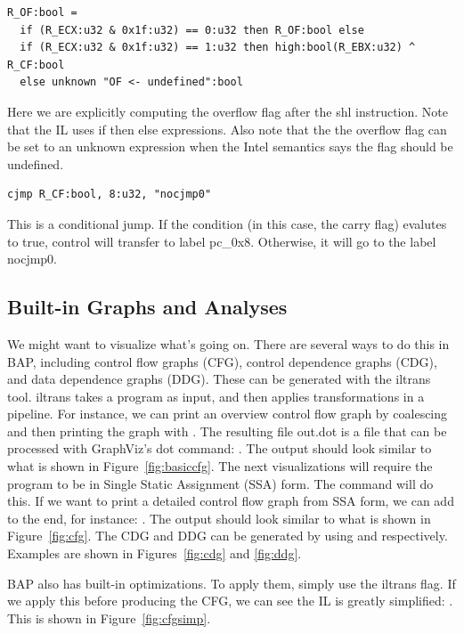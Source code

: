 \begin{verbatim}
R_OF:bool =
  if (R_ECX:u32 & 0x1f:u32) == 0:u32 then R_OF:bool else
  if (R_ECX:u32 & 0x1f:u32) == 1:u32 then high:bool(R_EBX:u32) ^ R_CF:bool
  else unknown "OF <- undefined":bool
\end{verbatim}
Here we are explicitly computing the overflow flag after the shl
instruction.  Note that the IL uses if then else expressions.  Also
note that the the overflow flag can be set to an unknown expression
when the Intel semantics says the flag should be undefined.

\begin{verbatim}
cjmp R_CF:bool, 8:u32, "nocjmp0"
\end{verbatim}
This is a conditional jump.  If the condition (in this case, the carry
flag) evalutes to true, control will transfer to label pc\_0x8.
Otherwise, it will go to the label nocjmp0.

\subsection{Built-in Graphs and Analyses}

We might want to visualize what's going on.  There are several ways to
do this in BAP, including control flow graphs (CFG), control
dependence graphs (CDG), and data dependence graphs (DDG).  These can
be generated with the iltrans tool.  iltrans takes a program as input,
and then applies transformations in a pipeline.  For instance, we can
print an overview control flow graph by coalescing and then printing
the graph with . The resulting file out.dot is a
file that can be processed with GraphViz's dot command: .  The output should look similar to what
is shown in Figure~\ref{fig:basiccfg}. The next visualizations will
require the program to be in Single Static Assignment (SSA) form.  The
command  will do this.  If we
want to print a detailed control flow graph from SSA form, we can add
 to the end, for instance: . The output should look
similar to what is shown in Figure~\ref{fig:cfg}. The CDG and DDG can
be generated by using  and 
respectively. Examples are shown in Figures~\ref{fig:cdg} and
\ref{fig:ddg}.

BAP also has built-in optimizations.  To apply them, simply use the
 iltrans flag.  If we apply this before producing
the CFG, we can see the IL is greatly simplified: . This is shown in
Figure~\ref{fig:cfgsimp}.

